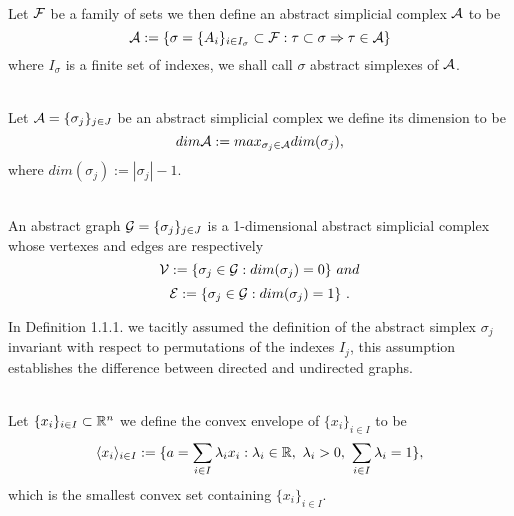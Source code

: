 \documentclass[../1.tex]{subfiles}
\begin{document}
    \begin{defn}
        \\
	Let $\mathcal{F}$ be a family of sets we then define an abstract simplicial complex $\mathcal{A}$ to be 
	\[\mathcal{A}:=\{ \sigma = \{A_i\}_{i \in I_\sigma} \subset \mathcal{F}: \tau \subset \sigma \Rightarrow \tau \in \mathcal{A} \}\] 
	where $I_\sigma$ is a finite set of indexes, we shall call $\sigma$ abstract simplexes of $\mathcal{A}$.
    \end{defn}
    \begin{defn}
        \\
	Let $\mathcal{A} = \{\sigma_j\}_{j \in J}$ be an abstract simplicial complex we define its dimension to be
	\[ dim \mathcal{A} := max_{\sigma_j \in \mathcal{A}}dim(\sigma_j), \]
	where $dim(\sigma_j) := |\sigma_j|-1$.
    \end{defn}
    \begin{defn}
        \\
	An abstract graph $\mathcal{G} = \{\sigma_j\}_{j \in J}$ is a 1-dimensional abstract simplicial complex whose 
	vertexes and edges are respectively
	\[ \mathcal{V} := \{ \sigma_j \in \mathcal{G} : dim(\sigma_j) = 0\} \ and \]
	\[ \mathcal{E} := \{ \sigma_j \in \mathcal{G} : dim(\sigma_j) = 1\} \ .\]
    \end{defn}
    In Definition 1.1.1. we tacitly assumed the definition of the abstract simplex $\sigma_j$ invariant
    with respect to permutations of the indexes $I_j$, this assumption establishes the difference between
    directed and undirected graphs.
    \begin{defn}
        \\
        Let $\{x_i\}_{i \in I} \subset \mathbb{R}^n$ we define the convex envelope of $\{x_i\}_{i \in I}$ to be 
        \[ \langle x_i \rangle_{i \in I} := \{ a = \sum_{i \in I} \lambda_i x_i : \lambda_i \in \mathbb{R},\ \lambda_i > 0,\  \sum_{i \in I} \lambda_i = 1 \},\]
        which is the smallest convex set containing $\{x_i\}_{i \in I}$.
    \end{defn}
    \begin{defn}
        \\
    \end{defn}
    \begin{defn}
        \\
    \end{defn}
    \begin{defn}
        \\
    \end{defn}
    \begin{thm}
        \\
    \end{thm}
\end{document}
